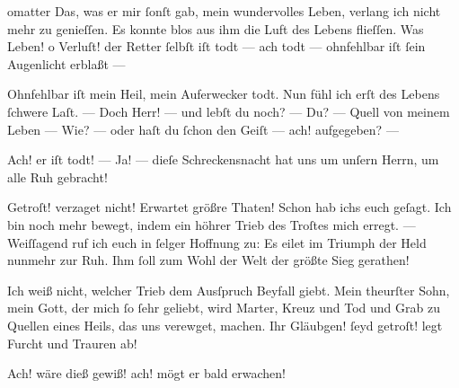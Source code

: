 \documentclass{ees}
\begin{document}
{\begin{movement}{omatter}
    \voice[Eidli]
    Das, was er mir ſonſt gab, mein wundervolles Leben,
    verlang ich nicht mehr zu genieſſen.
    Es konnte blos aus ihm die Luft des Lebens flieſſen.
    Was Leben! o Verluſt! der Retter ſelbſt iſt todt —
    ach todt — ohnfehlbar iſt ſein Augenlicht erblaßt —

    \voice[Lazarus]
    Ohnfehlbar iſt mein Heil, mein Auferwecker todt.
    Nun fühl ich erſt des Lebens ſchwere Laſt. —
    Doch Herr! — und lebſt du noch? — Du? — Quell von meinem Leben —
    Wie? — oder haſt du ſchon den Geiſt — ach! aufgegeben? —

    Ach! er iſt todt! — Ja! — dieſe Schreckensnacht
    hat uns um unſern Herrn, um alle Ruh gebracht!

    \voice[Johannes]
    Getroſt! verzaget nicht! Erwartet größre Thaten!
    Schon hab ichs euch geſagt. Ich bin noch mehr bewegt,
    indem ein höhrer Trieb des Troſtes mich erregt. —
    Weiſſagend ruf ich euch in ſelger Hoffnung zu:
    Es eilet im Triumph der Held nunmehr zur Ruh.
    Ihm ſoll zum Wohl der Welt der größte Sieg gerathen!

    \voice[Maria]
    Ich weiß nicht, welcher Trieb dem Ausſpruch Beyfall giebt.
    Mein theurſter Sohn, mein Gott, der mich ſo ſehr geliebt,
    wird Marter, Kreuz und Tod und Grab
    zu Quellen eines Heils, das uns verewget, machen.
    Ihr Gläubgen! ſeyd getroſt! legt Furcht und Trauren ab!

    Ach! wäre dieß gewiß! ach! mögt er bald erwachen!
  \end{movement}







}

\eesScore
\end{document}
